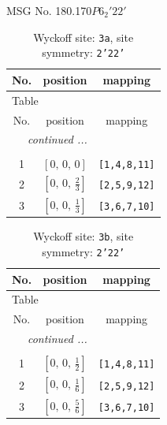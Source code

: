 \documentclass[fleqn,8pt]{jsarticle}
\begin{document}
\setcounter{MaxMatrixCols}{32}

\renewcommand{\tablename}{Table~}
\renewcommand{\figurename}{Figure~}
\begin{center}
\LARGE
MSG No. 180.170\quad$P6_{2}'22'$
\end{center}
\renewcommand{\arraystretch}{1.2}
\begin{longtable}{ccc}
\caption{Wyckoff site: {\tt 3a}, site symmetry: {\tt 2'22'}}
 \\
 \hline \hline
No. & position & mapping \\ \hline \endfirsthead

\multicolumn{2}{l}{\tablename\ \thetable{}} \\
 \hline \hline
No. & position & mapping \\ \hline \endhead

 \hline \hline
\multicolumn{2}{r}{\footnotesize\it continued ...} \\ \endfoot

 \hline \hline
\multicolumn{2}{r}{} \\ \endlastfoot

1 & $\left[ 0,\, 0,\, 0 \right]$ & {\tt [1,4,8,11]} \\ \hline
2 & $\left[ 0,\, 0,\, \frac{2}{3} \right]$ & {\tt [2,5,9,12]} \\ \hline
3 & $\left[ 0,\, 0,\, \frac{1}{3} \right]$ & {\tt [3,6,7,10]} \\
\end{longtable}
\renewcommand{\arraystretch}{1.2}
\begin{longtable}{ccc}
\caption{Wyckoff site: {\tt 3b}, site symmetry: {\tt 2'22'}}
 \\
 \hline \hline
No. & position & mapping \\ \hline \endfirsthead

\multicolumn{2}{l}{\tablename\ \thetable{}} \\
 \hline \hline
No. & position & mapping \\ \hline \endhead

 \hline \hline
\multicolumn{2}{r}{\footnotesize\it continued ...} \\ \endfoot

 \hline \hline
\multicolumn{2}{r}{} \\ \endlastfoot

1 & $\left[ 0,\, 0,\, \frac{1}{2} \right]$ & {\tt [1,4,8,11]} \\ \hline
2 & $\left[ 0,\, 0,\, \frac{1}{6} \right]$ & {\tt [2,5,9,12]} \\ \hline
3 & $\left[ 0,\, 0,\, \frac{5}{6} \right]$ & {\tt [3,6,7,10]} \\
\end{longtable}
\end{document}
